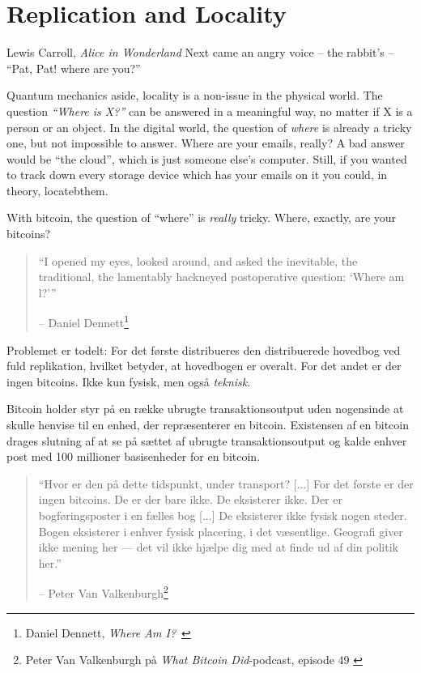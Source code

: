 \chapter{Replication and Locality}
\label{les:3}

\begin{chapquote}{Lewis Carroll, \textit{Alice in Wonderland}}
Next came an angry voice -- the rabbit's -- \enquote{Pat, Pat! where are you?}
\end{chapquote}

Quantum mechanics aside, locality is a non-issue in the physical world.
The question \textit{\enquote{Where is X?}} can be answered in a meaningful 
way, no matter if X is a person or an object. In the digital world, the question
of \textit{where} is already a tricky one, but not impossible to answer. Where
are your emails, really? A bad answer would be \enquote{the cloud}, which is
just someone else's computer. Still, if you wanted to track down every
storage device which has your emails on it you could, in theory, locatebthem.

With bitcoin, the question of \enquote{where} is \textit{really} tricky. Where,
exactly, are your bitcoins?

\begin{quotation}\begin{samepage}
\enquote{I opened my eyes, looked around, and asked the inevitable, the
traditional, the lamentably hackneyed postoperative question: `Where am l?'}
\begin{flushright} -- Daniel Dennett\footnote{Daniel Dennett, 
    \textit{Where Am I?}~\cite{where-am-i}}
\end{flushright}\end{samepage}\end{quotation}

Problemet er todelt: For det første distribueres den distribuerede hovedbog 
ved fuld replikation, hvilket betyder, at hovedbogen er overalt. For det andet 
er der ingen bitcoins. Ikke kun fysisk, men også \textit{teknisk}.

Bitcoin holder styr på en række ubrugte transaktionsoutput uden nogensinde at 
skulle henvise til en enhed, der repræsenterer en bitcoin. Existensen af en 
bitcoin drages slutning af at se på sættet af ubrugte transaktionsoutput og 
kalde enhver post med 100 millioner basisenheder for en bitcoin.

\begin{quotation}\begin{samepage}
\enquote{Hvor er den på dette tidspunkt, under transport? [...] For det første 
er der ingen bitcoins. De er der bare ikke. De eksisterer ikke. Der er 
bogføringsposter i en fælles bog [...] De eksisterer ikke fysisk nogen steder. 
Bogen eksisterer i enhver fysisk placering, i det væsentlige. Geografi giver 
ikke mening her --- det vil ikke hjælpe dig med at finde ud af din politik her.}
\begin{flushright} -- Peter Van Valkenburgh\footnote{Peter Van Valkenburgh på 
    \textit{What Bitcoin Did}-podcast, episode 49 \cite{wbd049}}
\end{flushright}\end{samepage}\end{quotation}

